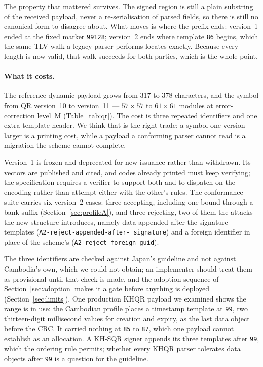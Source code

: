 \documentclass[10pt,a4paper,twocolumn]{article}
\newcommand{\code}[1]{\texttt{\small #1}}
\begin{document}
The property that mattered survives. The signed region is still a plain
substring of the received payload, never a re-serialisation of parsed fields,
so there is still no canonical form to disagree about. What moves is where the
prefix ends: version~1 ended at the fixed marker \code{99128}; version~2 ends
where template \code{86} begins, which the same TLV walk a legacy parser
performs locates exactly. Because every length is now valid, that walk succeeds
for both parties, which is the whole point.

\paragraph{What it costs.} The reference dynamic payload grows from 317 to 378
characters, and the symbol from QR version~10 to version~11 --- $57\times57$ to
$61\times61$ modules at error-correction level~M (Table~\ref{tab:qr}). The cost
is three repeated identifiers and one extra template header. We think that is
the right trade: a symbol one version larger is a printing cost, while a payload
a conforming parser cannot read is a migration the scheme cannot complete.

Version~1 is frozen and deprecated for new issuance rather than withdrawn. Its
vectors are published and cited, and codes already printed must keep verifying;
the specification requires a verifier to support both and to dispatch on the
encoding rather than attempt either with the other's rules. The conformance
suite carries six version~2 cases: three accepting, including one bound
through a bank suffix (Section~\ref{sec:profileA}), and three rejecting, two
of them the attacks the new structure introduces, namely data appended after
the signature templates (\code{A2-reject-\allowbreak appended-\allowbreak after-\allowbreak
signature}) and a foreign identifier in place of the scheme's
(\code{A2-reject-\allowbreak foreign-\allowbreak guid}).

The three identifiers are checked against Japan's guideline and not against
Cambodia's own, which we could not obtain; an implementer should treat them as
provisional until that check is made, and the adoption sequence of
Section~\ref{sec:adoption} makes it a gate before anything is deployed
(Section~\ref{sec:limits}). One production KHQR payload we examined shows the
range is in use: the Cambodian profile places a timestamp template at
\code{99}, two thirteen-digit millisecond values for creation and expiry, as
the last data object before the CRC. It carried nothing at \code{85} to
\code{87}, which one payload cannot establish as an allocation. A KH-SQR
signer appends its three templates after \code{99}, which the ordering rule
permits; whether every KHQR parser tolerates data objects after \code{99} is a
question for the guideline.
\end{document}
